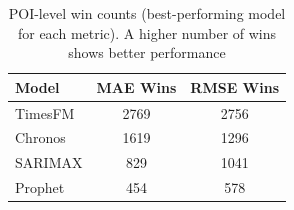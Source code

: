 \begin{table}[htbp]
\centering
\caption{POI-level win counts (best-performing model for each metric). A higher number of wins shows better performance}
\begin{tabular}{lcc}
\toprule
Model & MAE Wins & RMSE Wins \\
\midrule
TimesFM & 2769 & 2756 \\
Chronos & 1619 & 1296 \\
SARIMAX & 829 & 1041 \\
Prophet & 454 & 578 \\
\bottomrule
\end{tabular}
\end{table}
